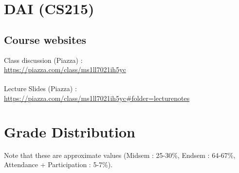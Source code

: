 \documentclass{article}
\begin{document}
\pagebreak


\section{DAI (CS215)}

    \subsection{Course websites}
    Class discussion (Piazza) : \\\url{https://piazza.com/class/ms1ll7021ih5yc}
    \\\\Lecture Slides (Piazza) : \\\url{https://piazza.com/class/ms1ll7021ih5yc#folder=lecturenotes}

    \section{Grade Distribution}
Note that these are approximate values (Midsem : 25-30\%, Endsem : 64-67\%, Attendance + Participation : 5-7\%).\\\\
\end{document}
